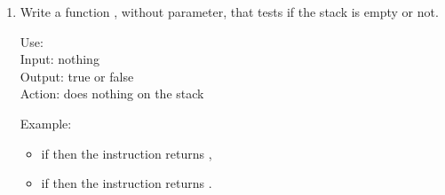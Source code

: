\documentclass[11pt,class=report,crop=false]{standalone}
\begin{document}
\begin{activite}
\begin{enumerate}
  \item Write a function , without parameter, that tests if the stack is empty or not. 
  
  \begin{fonction}
  Use:  \\
  Input: nothing \\
  Output: true or false \\
  Action: does nothing on the stack
  
  \medskip
    
  Example: 
  \begin{itemize}
    \item if  then the instruction  returns ,
    \item if  then the instruction  returns .
  \end{itemize}
  \end{fonction}
\end{enumerate} 
\end{activite}




\end{document}
